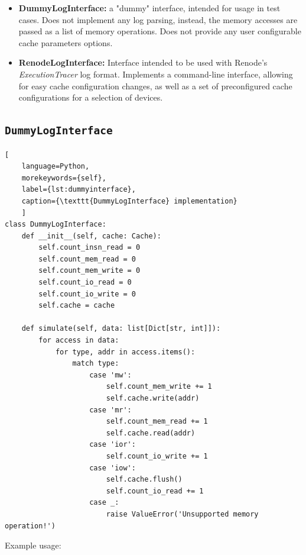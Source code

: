 \begin{itemize}
	\item \textbf{DummyLogInterface:} a "dummy" interface, intended for usage in test cases. Does not implement any log parsing, instead, the memory accesses are passed as a list of
        memory operations. Does not provide any user configurable cache parameters options.
    \item \textbf{RenodeLogInterface:} Interface intended to be used with Renode's \textit{ExecutionTracer} log format. Implements a command-line interface, allowing for easy cache
        configuration changes, as well as a set of preconfigured cache configurations for a selection of devices.
\end{itemize}


\subsection{\texttt{DummyLogInterface}}

\begin{center}
\centering
\begin{minipage}{\linewidth}
\begin{lstlisting}[
    language=Python,
	morekeywords={self},
    label={lst:dummyinterface},
    caption={\texttt{DummyLogInterface} implementation}
    ]
class DummyLogInterface:
    def __init__(self, cache: Cache):
        self.count_insn_read = 0
        self.count_mem_read = 0
        self.count_mem_write = 0
        self.count_io_read = 0
        self.count_io_write = 0
        self.cache = cache

    def simulate(self, data: list[Dict[str, int]]):
        for access in data:
            for type, addr in access.items():
                match type:
                    case 'mw':
                        self.count_mem_write += 1
                        self.cache.write(addr)
                    case 'mr':
                        self.count_mem_read += 1
                        self.cache.read(addr)
                    case 'ior':
                        self.count_io_write += 1
                    case 'iow':
                        self.cache.flush()
                        self.count_io_read += 1
                    case _:
                        raise ValueError('Unsupported memory operation!')
\end{lstlisting}
\end{minipage}
\end{center}

\noindent Example usage:

